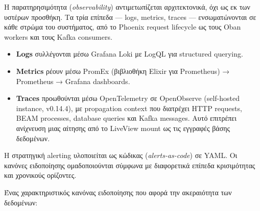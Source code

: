 Η παρατηρησιμότητα (\emph{observability}) αντιμετωπίζεται αρχιτεκτονικά,
όχι ως εκ των υστέρων προσθήκη. Τα τρία επίπεδα --- logs, metrics,
traces --- ενσωματώνονται σε κάθε στρώμα του συστήματος, από το Phoenix
request lifecycle ως τους Oban workers και τους Kafka consumers.

\begin{itemize}
\tightlist
\item
  \textbf{Logs} συλλέγονται μέσω Grafana Loki με LogQL για structured
  querying.
\item
  \textbf{Metrics} ρέουν μέσω PromEx (βιβλιοθήκη Elixir για Prometheus)
  → Prometheus → Grafana dashboards.
\item
  \textbf{Traces} προωθούνται μέσω OpenTelemetry σε OpenObserve
  (self-hosted instance, v0.14.4), με propagation context που διατρέχει
  HTTP requests, BEAM processes, database queries και Kafka messages.
  Αυτό επιτρέπει ανίχνευση μιας αίτησης από το LiveView mount ως τις
  εγγραφές βάσης δεδομένων.
\end{itemize}

Η στρατηγική alerting υλοποιείται ως κώδικας (\emph{alerts-as-code}) σε
YAML. Οι κανόνες ειδοποίησης ομαδοποιούνται σύμφωνα με διαφορετικά
επίπεδα κρισιμότητας και χρονικούς ορίζοντες.

Ένας χαρακτηριστικός κανόνας ειδοποίησης που αφορά την ακεραιότητα των
δεδομένων:

\begin{Shaded}
\begin{Highlighting}[]
\KeywordTok{{-}}\AttributeTok{ }\KeywordTok{:}
\AttributeTok{  }\KeywordTok{:}
\AttributeTok{  }\KeywordTok{:}
\AttributeTok{    }\KeywordTok{{-}}\AttributeTok{ }\KeywordTok{:}
\AttributeTok{      }\KeywordTok{:}
\AttributeTok{      }\KeywordTok{:}
\AttributeTok{      }\KeywordTok{:}
\AttributeTok{        }\KeywordTok{:}
\AttributeTok{      }\KeywordTok{:}
\AttributeTok{        }\KeywordTok{:}
\AttributeTok{        }\KeywordTok{:}
\AttributeTok{        }\KeywordTok{:}
\end{Highlighting}
\end{Shaded}

